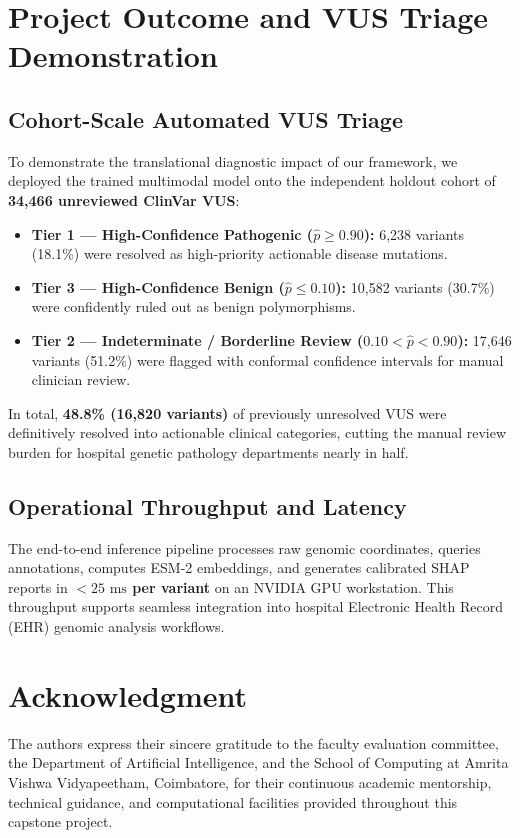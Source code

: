 \documentclass[conference]{IEEEtran}
\begin{document}
\section{Project Outcome and VUS Triage Demonstration}

\subsection{Cohort-Scale Automated VUS Triage}
To demonstrate the translational diagnostic impact of our framework, we deployed the trained multimodal model onto the independent holdout cohort of \textbf{34,466 unreviewed ClinVar VUS}:
\begin{itemize}
    \item \textbf{Tier 1 --- High-Confidence Pathogenic ($\hat{p} \ge 0.90$):} 6,238 variants (18.1\%) were resolved as high-priority actionable disease mutations.
    \item \textbf{Tier 3 --- High-Confidence Benign ($\hat{p} \le 0.10$):} 10,582 variants (30.7\%) were confidently ruled out as benign polymorphisms.
    \item \textbf{Tier 2 --- Indeterminate / Borderline Review ($0.10 < \hat{p} < 0.90$):} 17,646 variants (51.2\%) were flagged with conformal confidence intervals for manual clinician review.
\end{itemize}
In total, \textbf{48.8\% (16,820 variants)} of previously unresolved VUS were definitively resolved into actionable clinical categories, cutting the manual review burden for hospital genetic pathology departments nearly in half.

\subsection{Operational Throughput and Latency}
The end-to-end inference pipeline processes raw genomic coordinates, queries annotations, computes ESM-2 embeddings, and generates calibrated SHAP reports in \textbf{$< 25\text{ ms}$ per variant} on an NVIDIA GPU workstation. This throughput supports seamless integration into hospital Electronic Health Record (EHR) genomic analysis workflows.

\section{Acknowledgment}
The authors express their sincere gratitude to the faculty evaluation committee, the Department of Artificial Intelligence, and the School of Computing at Amrita Vishwa Vidyapeetham, Coimbatore, for their continuous academic mentorship, technical guidance, and computational facilities provided throughout this capstone project.
\end{document}
